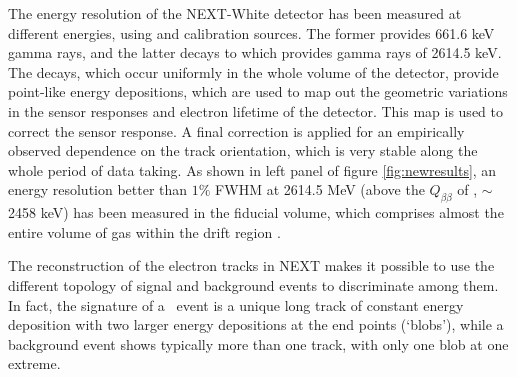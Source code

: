 The energy resolution of the NEXT-White detector has been measured at different energies, using  and  calibration sources. The former provides 661.6 keV gamma rays, and the latter decays to  which provides gamma rays of 2614.5 keV. The  decays, which occur uniformly in the whole volume of the detector, provide point-like energy depositions, which are used to map out the geometric variations in the sensor responses and electron lifetime of the detector. This map is used to correct the sensor response. A final correction is applied for an empirically observed dependence on the track orientation, which is very stable along the whole period of data taking. As shown in left panel of figure \ref{fig:newresults}, an energy resolution better than $1\%$ FWHM at 2614.5 MeV (above the $Q_{\beta\beta}$ of , $\sim$2458 keV) has been measured in the fiducial volume, which comprises almost the entire volume of gas within the drift region \cite{Renner:2019pfe}.



The reconstruction of the electron tracks in NEXT makes it possible to use the different topology of signal and background events to discriminate among them. In fact, the signature of a \bbonu ~event is a unique long track of constant energy deposition with two larger energy depositions at the end points (‘blobs’), while a background event shows typically more than one track, with only one blob at one extreme. 



